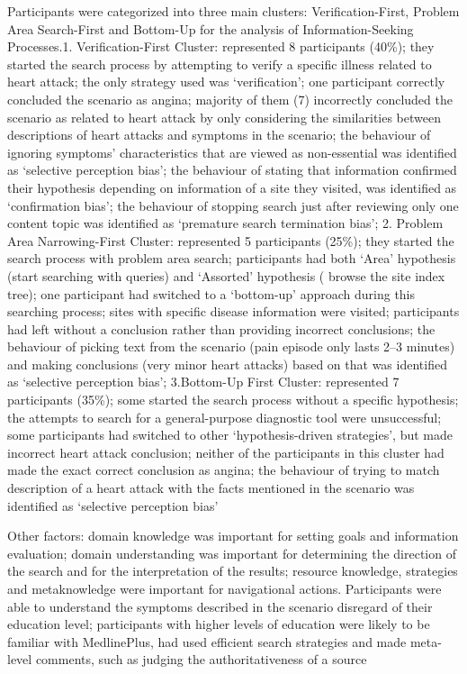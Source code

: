 \documentclass[]{article}
\begin{document}
Participants were categorized into three main clusters: Verification-First, Problem Area Search-First and Bottom-Up for the analysis of Information-Seeking Processes.1. Verification-First Cluster: represented 8 participants (40\%); they started the search process by attempting to verify a specific illness related to heart attack; the only strategy used was ‘verification’; one participant correctly concluded the scenario as angina; majority of them (7) incorrectly concluded the scenario as related to heart attack by only considering the similarities between descriptions of heart attacks and symptoms in the scenario; the behaviour of ignoring symptoms’ characteristics that are viewed as non-essential was identified as ‘selective perception bias’; the behaviour of stating that information confirmed their hypothesis depending on information of a site they visited, was identified as ‘confirmation bias’; the behaviour of stopping search just after reviewing only one content topic was identified as ‘premature search termination bias’; 2. Problem Area Narrowing-First Cluster: represented 5 participants (25\%); they started the search process with problem area search; participants had both ‘Area’ hypothesis (start searching with queries) and ‘Assorted’ hypothesis ( browse the site index tree); one participant had switched to a ‘bottom-up’ approach during this searching process; sites with specific disease information were visited; participants had left without a conclusion rather than providing incorrect conclusions; the behaviour of picking text from the scenario (pain episode only lasts 2–3 minutes) and making conclusions (very minor heart attacks) based on that was identified as ‘selective perception bias'; 3.Bottom-Up First Cluster: represented 7 participants (35\%); some started the search process without a specific hypothesis; the attempts to search for a general-purpose diagnostic tool were unsuccessful; some participants had  switched to other ‘hypothesis-driven strategies’, but made incorrect heart attack conclusion; neither of the participants in this cluster had made the exact correct conclusion as angina; the behaviour of trying to match description of a heart attack with the facts mentioned in the scenario was identified as ‘selective perception bias’                      
     
Other factors: domain knowledge was important for setting goals and information evaluation; domain understanding was important for determining the direction of the search and for the interpretation of the results; resource knowledge, strategies and metaknowledge were important for navigational actions. Participants were able to understand the symptoms described in the scenario disregard of their education level; participants with higher levels of education were likely to be familiar with MedlinePlus, had used efficient search strategies and made meta-level comments, such as judging the authoritativeness of a source
\end{document}
